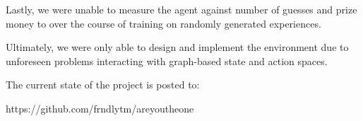 \documentclass{article}
\begin{document}
Lastly, we were unable to measure the agent against number of guesses
and prize money to over the course of training on randomly generated
experiences.

Ultimately, we were only able to design and implement the environment
due to unforeseen problems interacting with graph-based state and action
spaces.

The current state of the project is posted to:

https://github.com/frndlytm/areyoutheone
\end{document}
